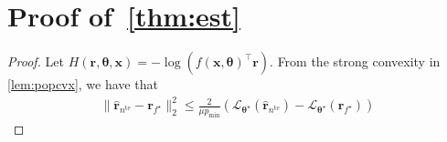 \section{Proof of~\texorpdfstring{\cref{thm:est}}{Theorem Reference}\label{app:thm:est}}
\begin{proof}
    Let $H(\boldsymbol{r}, \boldsymbol{\theta}, \boldsymbol{x}) = -\log(f(\boldsymbol{x}, \boldsymbol{\theta})^\top \boldsymbol{r})$. From the strong convexity in \cref{lem:popcvx}, we have that
    \begin{align}
    \label{eq:wbound}
    \| \hat{\boldsymbol{r}}_{{n}^{\text{te}}} - \boldsymbol{r}_{f^\star} \|_2^2 \leq \frac{2}{\mu p_{\min}}\left( \mathcal{L}_{\boldsymbol{\theta}^\star}(\hat{\boldsymbol{r}}_{{n}^{\text{te}}}) - \mathcal{L}_{\boldsymbol{\theta}^\star}(\boldsymbol{r}_{f^\star}) \right)
    \end{align}


\end{proof}
